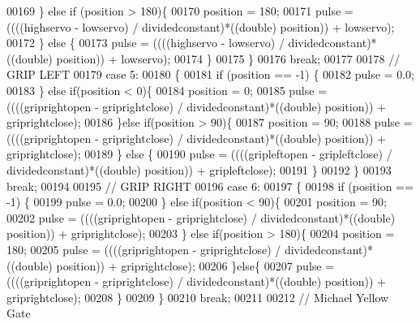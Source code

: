 \begin{DoxyCode}
00169             \} \textcolor{keywordflow}{else} \textcolor{keywordflow}{if} (position > 180)\{
00170                 position = 180;
00171                 pulse = ((((highservo - lowservo) / dividedconstant)*((double) position)) + lowservo);
00172             \} \textcolor{keywordflow}{else} \{
00173                 pulse = ((((highservo - lowservo) / dividedconstant)*((double) position)) + lowservo);
00174             \}
00175         \}
00176             \textcolor{keywordflow}{break};
00177 
00178             \textcolor{comment}{// GRIP LEFT}
00179         \textcolor{keywordflow}{case} 5:
00180         \{
00181             \textcolor{keywordflow}{if} (position == -1) \{
00182                 pulse = 0.0;
00183             \} \textcolor{keywordflow}{else} \textcolor{keywordflow}{if}(position < 0)\{
00184                 position = 0;
00185                 pulse = ((((griprightopen - griprightclose) / dividedconstant)*((double) position)) + 
      griprightclose);
00186             \}\textcolor{keywordflow}{else} \textcolor{keywordflow}{if}(position > 90)\{
00187                 position = 90;
00188                 pulse = ((((griprightopen - griprightclose) / dividedconstant)*((double) position)) + 
      griprightclose);
00189             \} \textcolor{keywordflow}{else} \{
00190                 pulse = ((((gripleftopen - gripleftclose) / dividedconstant)*((double) position)) + 
      gripleftclose);
00191             \}
00192         \}
00193             \textcolor{keywordflow}{break};
00194 
00195             \textcolor{comment}{// GRIP RIGHT}
00196         \textcolor{keywordflow}{case} 6:
00197         \{
00198             \textcolor{keywordflow}{if} (position == -1) \{
00199                 pulse = 0.0;
00200             \} \textcolor{keywordflow}{else} \textcolor{keywordflow}{if}(position < 90)\{
00201                 position = 90;
00202                 pulse = ((((griprightopen - griprightclose) / dividedconstant)*((double) position)) + 
      griprightclose);
00203             \} \textcolor{keywordflow}{else} \textcolor{keywordflow}{if}(position > 180)\{
00204                 position = 180;
00205                 pulse = ((((griprightopen - griprightclose) / dividedconstant)*((double) position)) + 
      griprightclose);
00206             \}\textcolor{keywordflow}{else}\{
00207                 pulse = ((((griprightopen - griprightclose) / dividedconstant)*((double) position)) + 
      griprightclose);
00208             \}
00209         \}
00210             \textcolor{keywordflow}{break};
00211 
00212             \textcolor{comment}{// Michael Yellow Gate}

\end{DoxyCode}
